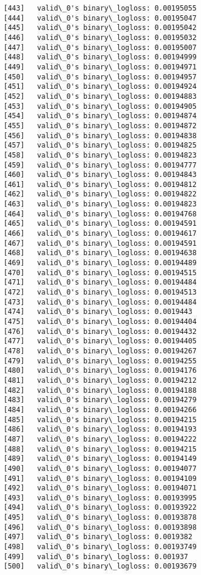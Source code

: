 \documentclass[11pt]{article}
\begin{document}
\begin{Verbatim}[commandchars=\\\{\}]
[443]	valid\_0's binary\_logloss: 0.00195055
[444]	valid\_0's binary\_logloss: 0.00195047
[445]	valid\_0's binary\_logloss: 0.00195042
[446]	valid\_0's binary\_logloss: 0.00195032
[447]	valid\_0's binary\_logloss: 0.00195007
[448]	valid\_0's binary\_logloss: 0.00194999
[449]	valid\_0's binary\_logloss: 0.00194971
[450]	valid\_0's binary\_logloss: 0.00194957
[451]	valid\_0's binary\_logloss: 0.00194924
[452]	valid\_0's binary\_logloss: 0.00194883
[453]	valid\_0's binary\_logloss: 0.00194905
[454]	valid\_0's binary\_logloss: 0.00194874
[455]	valid\_0's binary\_logloss: 0.00194872
[456]	valid\_0's binary\_logloss: 0.00194838
[457]	valid\_0's binary\_logloss: 0.00194825
[458]	valid\_0's binary\_logloss: 0.00194823
[459]	valid\_0's binary\_logloss: 0.00194777
[460]	valid\_0's binary\_logloss: 0.00194843
[461]	valid\_0's binary\_logloss: 0.00194812
[462]	valid\_0's binary\_logloss: 0.00194822
[463]	valid\_0's binary\_logloss: 0.00194823
[464]	valid\_0's binary\_logloss: 0.00194768
[465]	valid\_0's binary\_logloss: 0.00194591
[466]	valid\_0's binary\_logloss: 0.00194617
[467]	valid\_0's binary\_logloss: 0.00194591
[468]	valid\_0's binary\_logloss: 0.00194638
[469]	valid\_0's binary\_logloss: 0.00194489
[470]	valid\_0's binary\_logloss: 0.00194515
[471]	valid\_0's binary\_logloss: 0.00194484
[472]	valid\_0's binary\_logloss: 0.00194513
[473]	valid\_0's binary\_logloss: 0.00194484
[474]	valid\_0's binary\_logloss: 0.0019443
[475]	valid\_0's binary\_logloss: 0.00194404
[476]	valid\_0's binary\_logloss: 0.00194432
[477]	valid\_0's binary\_logloss: 0.00194405
[478]	valid\_0's binary\_logloss: 0.00194267
[479]	valid\_0's binary\_logloss: 0.00194255
[480]	valid\_0's binary\_logloss: 0.00194176
[481]	valid\_0's binary\_logloss: 0.00194212
[482]	valid\_0's binary\_logloss: 0.00194188
[483]	valid\_0's binary\_logloss: 0.00194279
[484]	valid\_0's binary\_logloss: 0.00194266
[485]	valid\_0's binary\_logloss: 0.00194215
[486]	valid\_0's binary\_logloss: 0.00194193
[487]	valid\_0's binary\_logloss: 0.00194222
[488]	valid\_0's binary\_logloss: 0.00194215
[489]	valid\_0's binary\_logloss: 0.00194149
[490]	valid\_0's binary\_logloss: 0.00194077
[491]	valid\_0's binary\_logloss: 0.00194109
[492]	valid\_0's binary\_logloss: 0.00194071
[493]	valid\_0's binary\_logloss: 0.00193995
[494]	valid\_0's binary\_logloss: 0.00193922
[495]	valid\_0's binary\_logloss: 0.00193878
[496]	valid\_0's binary\_logloss: 0.00193898
[497]	valid\_0's binary\_logloss: 0.0019382
[498]	valid\_0's binary\_logloss: 0.00193749
[499]	valid\_0's binary\_logloss: 0.001937
[500]	valid\_0's binary\_logloss: 0.00193679

\end{Verbatim}
\end{document}
